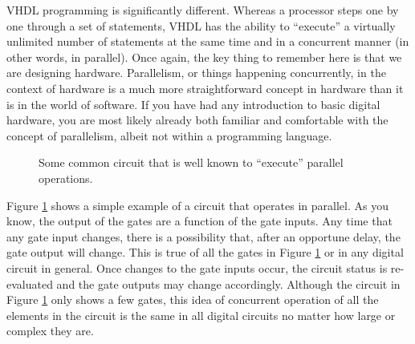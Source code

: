 VHDL programming is significantly different. Whereas a processor steps one by one through a set of statements, VHDL has the ability to ``execute'' a virtually unlimited number of statements at the same time and in a concurrent manner (in other words, in parallel). Once again, the key thing to remember here is that we are designing hardware. Parallelism, or things happening concurrently, in the context of hardware is a much more straightforward concept in hardware than it is in the world of software. If you have had any introduction to basic digital hardware, you are most likely already both familiar and comfortable with the concept of parallelism, albeit not within a programming language.

\begin{figure}
\centering
\usetikzlibrary{er}
\caption{Some common circuit that is well known to ``execute'' parallel operations.}
\label{concurrent_circuit}
\end{figure}

Figure \ref{concurrent_circuit} shows a simple example of a circuit that operates in parallel. As you know, the output of the gates are a function of the gate inputs. Any time that any gate input changes, there is a possibility that, after an opportune delay, the gate output will change. This is true of all the gates in Figure \ref{concurrent_circuit} or in any digital circuit in general. Once changes to the gate inputs occur, the circuit status is re-evaluated and the gate outputs may change accordingly. Although the circuit in Figure \ref{concurrent_circuit} only shows a few gates, this idea of concurrent operation of all the elements in the circuit is the same in all digital circuits no matter how large or complex they are.

